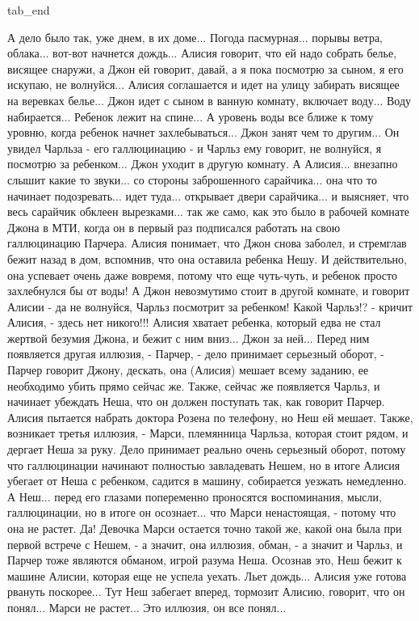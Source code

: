   tab_end
\fi

А дело было так, уже днем, в их доме... Погода пасмурная... порывы ветра,
облака... вот-вот начнется дождь...  Алисия говорит, что ей надо собрать белье,
висящее снаружи, а Джон ей говорит, давай, а я пока посмотрю за сыном, я его
искупаю, не волнуйся... Алисия соглашается и идет на улицу забирать висящее на
веревках белье... Джон идет с сыном в ванную комнату, включает воду... Воду
набирается... Ребенок лежит на спине... А уровень воды все ближе к тому уровню,
когда ребенок начнет захлебываться... Джон занят чем то другим... Он увидел
Чарльза - его галлюцинацию - и Чарльз ему говорит, не волнуйся, я посмотрю за
ребенком... Джон уходит в другую комнату. А Алисия... внезапно слышит какие то
звуки...  со стороны заброшенного сарайчика... она что то начинает
подозревать... идет туда... открывает двери сарайчика... и выясняет, что весь
сарайчик обклеен вырезками... так же само, как это было в рабочей комнате Джона
в МТИ, когда он в первый раз подписался работать на свою галлюцинацию Парчера.
Алисия понимает, что Джон снова заболел, и стремглав бежит назад в дом,
вспомнив, что она оставила ребенка Нешу. И действительно, она успевает очень
даже вовремя, потому что еще чуть-чуть, и ребенок просто захлебнулся бы от
воды! А Джон невозмутимо стоит в другой комнате, и говорит Алисии - да не
волнуйся, Чарльз посмотрит за ребенком! Какой Чарльз!? - кричит Алисия, - здесь
нет никого!!! Алисия хватает ребенка, который едва не стал жертвой безумия
Джона, и бежит с ним вниз... Джон за ней... Перед ним появляется другая
иллюзия, - Парчер, - дело принимает серьезный оборот, - Парчер говорит Джону,
дескать, она (Алисия) мешает всему заданию, ее необходимо убить прямо сейчас
же.  Также, сейчас же появляется Чарльз, и начинает убеждать Неша, что он
должен поступать так, как говорит Парчер.  Алисия пытается набрать доктора
Розена по телефону, но Неш ей мешает.  Также, возникает третья иллюзия, -
Марси, племянница Чарльза, которая стоит рядом, и дергает Неша за руку. Дело
принимает реально очень серьезный оборот, потому что галлюцинации начинают
полностью завладевать Нешем, но в итоге Алисия убегает от Неша с ребенком,
садится в машину, собирается уезжать немедленно. А Неш... перед его глазами
попеременно проносятся воспоминания, мысли, галлюцинации, но в итоге он
осознает... что Марси ненастоящая, - потому что она не растет. Да! Девочка
Марси остается точно такой же, какой она была при первой встрече с Нешем, - а
значит, она иллюзия, обман, - а значит и Чарльз, и Парчер тоже являются
обманом, игрой разума Неша. Осознав это, Неш бежит к машине Алисии, которая еще
не успела уехать. Льет дождь... Алисия уже готова рвануть поскорее... Тут Неш забегает вперед,
тормозит Алисию, говорит, что он понял... Марси не растет... Это иллюзия, он все понял...

